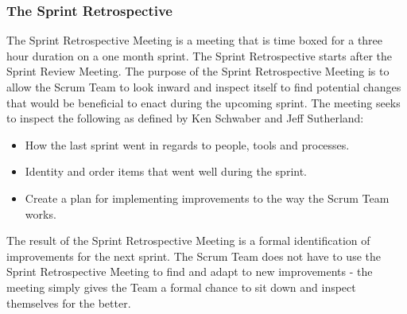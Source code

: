 \subsubsection{The Sprint Retrospective}

The Sprint Retrospective Meeting is a meeting that is time boxed for a three
hour duration on a one month sprint. The Sprint Retrospective starts after the
Sprint Review Meeting.
The purpose of the Sprint Retrospective Meeting is to allow the Scrum Team to look inward 
and inspect itself to find potential changes that would be beneficial to enact during the 
upcoming sprint\cite{scrumguide11}. The meeting seeks to inspect the 
following as defined by Ken Schwaber and Jeff Sutherland:

\begin{itemize}
	\item	How the last sprint went in regards to people, tools and processes. 
	\item Identity and order items that went well during the sprint.
	\item	Create a plan for implementing improvements to the way the Scrum Team
	works.\cite{scrumguide11}
\end{itemize}


The result of the Sprint Retrospective Meeting is a formal identification of improvements 
for the next sprint\cite{scrumguide11}. The Scrum Team does not have to use the Sprint 
Retrospective Meeting to find and adapt to new improvements - the meeting simply gives the 
Team a formal chance to sit down and inspect themselves for the
better\cite{scrumguide11}.
